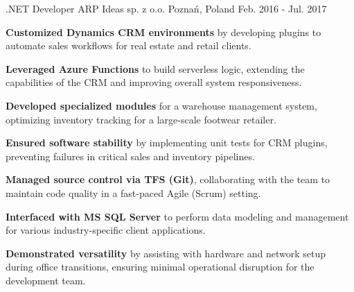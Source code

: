 \begin{cventries}
  \cventry
    {.NET Developer} %
    {ARP Ideas sp. z o.o.} %
    {Poznań, Poland} %
    {Feb. 2016 - Jul. 2017} %
    {
      \begin{cvitems} %
        \item {\textbf{Customized Dynamics CRM environments} by developing plugins to automate sales workflows for real estate and retail clients.}
        \item {\textbf{Leveraged Azure Functions} to build serverless logic, extending the capabilities of the CRM and improving overall system responsiveness.}
        \item {\textbf{Developed specialized modules} for a warehouse management system, optimizing inventory tracking for a large-scale footwear retailer.}
        \item {\textbf{Ensured software stability} by implementing unit tests for CRM plugins, preventing failures in critical sales and inventory pipelines.}
        \item {\textbf{Managed source control via TFS (Git)}, collaborating with the team to maintain code quality in a fast-paced Agile (Scrum) setting.}
        \item {\textbf{Interfaced with MS SQL Server} to perform data modeling and management for various industry-specific client applications.}
        \item {\textbf{Demonstrated versatility} by assisting with hardware and network setup during office transitions, ensuring minimal operational disruption for the development team.}
      \end{cvitems}
    }

\end{cventries}
